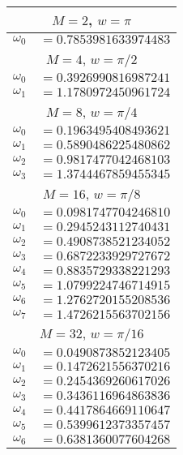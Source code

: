 \begin{table}[p]
  \centering\small%
\begin{minipage}[t]{3in}
\null%
\begin{tabular}{l@{}l} \toprule
\multicolumn{2}{c}{$M=2$, $w=\pi$ } \\ \midrule
$\omega_{0}$ & ${}=0.7853981633974483$ \\ \toprule
\multicolumn{2}{c}{$M=4$, $w=\pi / 2$ } \\ \midrule
$\omega_{0}$ & ${}=0.3926990816987241$ \\
$\omega_{1}$ & ${}=1.1780972450961724$ \\ \toprule
\multicolumn{2}{c}{$M=8$, $w=\pi / 4$ } \\ \midrule
$\omega_{0}$ & ${}=0.1963495408493621$ \\
$\omega_{1}$ & ${}=0.5890486225480862$ \\
$\omega_{2}$ & ${}=0.9817477042468103$ \\
$\omega_{3}$ & ${}=1.3744467859455345$ \\ \toprule
\multicolumn{2}{c}{$M=16$, $w=\pi / 8$ } \\ \midrule
$\omega_{0}$ & ${}=0.0981747704246810$ \\
$\omega_{1}$ & ${}=0.2945243112740431$ \\
$\omega_{2}$ & ${}=0.4908738521234052$ \\
$\omega_{3}$ & ${}=0.6872233929727672$ \\
$\omega_{4}$ & ${}=0.8835729338221293$ \\
$\omega_{5}$ & ${}=1.0799224746714915$ \\
$\omega_{6}$ & ${}=1.2762720155208536$ \\
$\omega_{7}$ & ${}=1.4726215563702156$ \\ \toprule
\multicolumn{2}{c}{$M=32$, $w=\pi / 16$ } \\ \midrule
$\omega_{0}$ & ${}=0.0490873852123405$ \\
$\omega_{1}$ & ${}=0.1472621556370216$ \\
$\omega_{2}$ & ${}=0.2454369260617026$ \\
$\omega_{3}$ & ${}=0.3436116964863836$ \\
$\omega_{4}$ & ${}=0.4417864669110647$ \\
$\omega_{5}$ & ${}=0.5399612373357457$ \\
$\omega_{6}$ & ${}=0.6381360077604268$ \\

\end{tabular}
\end{minipage}
\end{table}
